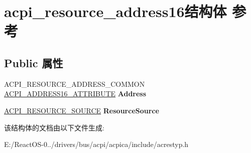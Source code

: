 \hypertarget{structacpi__resource__address16}{}\section{acpi\+\_\+resource\+\_\+address16结构体 参考}
\label{structacpi__resource__address16}
\subsection*{Public 属性}
\begin{DoxyCompactItemize}
\item 
\mbox{\label{structacpi__resource__address16_a46a84bdf26019b8fb053b4f082ab6d69}} 
A\+C\+P\+I\+\_\+\+R\+E\+S\+O\+U\+R\+C\+E\+\_\+\+A\+D\+D\+R\+E\+S\+S\+\_\+\+C\+O\+M\+M\+ON \hyperlink{structacpi__address16__attribute}{A\+C\+P\+I\+\_\+\+A\+D\+D\+R\+E\+S\+S16\+\_\+\+A\+T\+T\+R\+I\+B\+U\+TE} {\bfseries Address}
\item 
\mbox{\label{structacpi__resource__address16_a10e543f869d985093cf62a422833710f}} 
\hyperlink{structacpi__resource__source}{A\+C\+P\+I\+\_\+\+R\+E\+S\+O\+U\+R\+C\+E\+\_\+\+S\+O\+U\+R\+CE} {\bfseries Resource\+Source}
\end{DoxyCompactItemize}


该结构体的文档由以下文件生成\+:\begin{DoxyCompactItemize}
\item 
E\+:/\+React\+O\+S-\/0../drivers/bus/acpi/acpica/include/acrestyp.\+h\end{DoxyCompactItemize}
